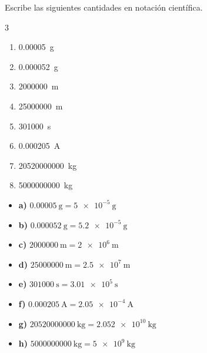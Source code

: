 \begin{exercise}
    Escribe las siguientes cantidades en notación científica.
    \begin{multicols}{3}
        \begin{enumerate}[label=\letraminuscula]
\item \qty{0.00005}{\g}
\item \qty{0.000052}{\g}
\item \qty{2000000}{\m}
\item \qty{25000000}{\m}
\item \qty{301000}{\s}
\item \qty{0.000205}{\ampere}
\item \qty{20520000000}{\kg}
\item \qty{5000000000}{\kg}
        \end{enumerate}
    \end{multicols}

    \begin{solu}
        \begin{itemize}
            \item \textbf{a)} \( \qty{0.00005}{\g} = \qty{5e-5}{\g} \)
            \item \textbf{b)} \( \qty{0.000052}{\g} = \qty{5.2e-5}{\g} \)
            \item \textbf{c)} \( \qty{2000000}{\m} = \qty{2e6}{\m} \)
            \item \textbf{d)} \( \qty{25000000}{\m} = \qty{2.5e7}{\m} \)
            \item \textbf{e)} \( \qty{301000}{\s} = \qty{3.01e5}{\s} \)
            \item \textbf{f)} \( \qty{0.000205}{\ampere} = \qty{2.05e-4}{\ampere} \)
            \item \textbf{g)} \( \qty{20520000000}{\kg} = \qty{2.052e10}{\kg} \)
            \item \textbf{h)} \( \qty{5000000000}{\kg} = \qty{5e9}{\kg} \)
        \end{itemize}
    \end{solu}

\end{exercise}

